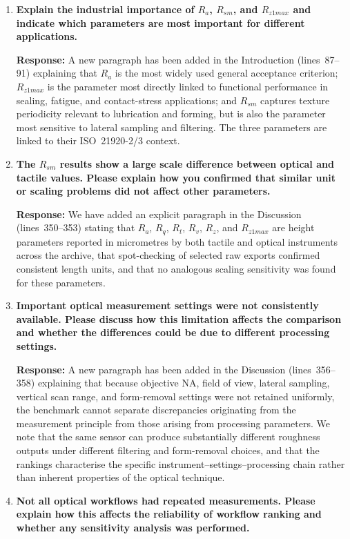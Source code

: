 \documentclass[10pt]{article}
\begin{document}
\begin{enumerate}[leftmargin=*, label=\textbf{Comment \arabic*.}, ref=\arabic*]
\item \textbf{Explain the industrial importance of $R_a$, $R_{sm}$, and $R_{z1max}$ and indicate which parameters are most important for different applications.}

\textbf{Response:} A new paragraph has been added in the Introduction (lines~87--91) explaining that $R_a$ is the most widely used general acceptance criterion; $R_{z1max}$ is the parameter most directly linked to functional performance in sealing, fatigue, and contact-stress applications; and $R_{sm}$ captures texture periodicity relevant to lubrication and forming, but is also the parameter most sensitive to lateral sampling and filtering. The three parameters are linked to their ISO~21920-2/3 context.

\item \textbf{The $R_{sm}$ results show a large scale difference between optical and tactile values. Please explain how you confirmed that similar unit or scaling problems did not affect other parameters.}

\textbf{Response:} We have added an explicit paragraph in the Discussion (lines~350--353) stating that $R_a$, $R_q$, $R_t$, $R_v$, $R_z$, and $R_{z1max}$ are height parameters reported in micrometres by both tactile and optical instruments across the archive, that spot-checking of selected raw exports confirmed consistent length units, and that no analogous scaling sensitivity was found for these parameters.

\item \textbf{Important optical measurement settings were not consistently available. Please discuss how this limitation affects the comparison and whether the differences could be due to different processing settings.}

\textbf{Response:} A new paragraph has been added in the Discussion (lines~356--358) explaining that because objective NA, field of view, lateral sampling, vertical scan range, and form-removal settings were not retained uniformly, the benchmark cannot separate discrepancies originating from the measurement principle from those arising from processing parameters. We note that the same sensor can produce substantially different roughness outputs under different filtering and form-removal choices, and that the rankings characterise the specific instrument--settings--processing chain rather than inherent properties of the optical technique.

\item \textbf{Not all optical workflows had repeated measurements. Please explain how this affects the reliability of workflow ranking and whether any sensitivity analysis was performed.}


\end{enumerate}
\end{document}
